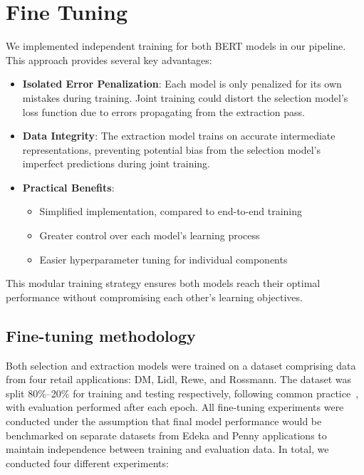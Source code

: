 \documentclass[licencjacka,en]{pracamgr}
\begin{document}
\section{Fine Tuning}
We implemented independent training for both BERT models in our pipeline. This approach provides several key advantages:

\begin{itemize}
    \item \textbf{Isolated Error Penalization}: Each model is only penalized for its own mistakes during training. Joint training could distort the selection model's loss function due to errors propagating from the extraction pass.
    
    \item \textbf{Data Integrity}: The extraction model trains on accurate intermediate representations, preventing potential bias from the selection model's imperfect predictions during joint training.
    
    \item \textbf{Practical Benefits}:
    \begin{itemize}
        \item Simplified implementation, compared to end-to-end training
        \item Greater control over each model's learning process
        \item Easier hyperparameter tuning for individual components
    \end{itemize}
\end{itemize}

This modular training strategy ensures both models reach their optimal performance without compromising each other's learning objectives.
\subsection{Fine-tuning methodology} \label{FTMethodologyBert}
Both selection and extraction models were trained on a dataset comprising data from four retail applications: DM, Lidl, Rewe, and Rossmann. The dataset was split 80\%--20\% for training and testing respectively, following common practice~\cite{pp}, with evaluation performed after each epoch. All fine-tuning experiments were conducted under the assumption that final model performance would be benchmarked on separate datasets from Edeka and Penny applications to maintain independence between training and evaluation data.
In total, we conducted four different experiments:
\end{document}
